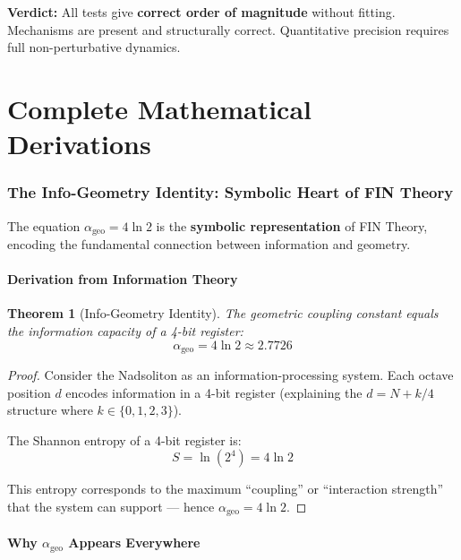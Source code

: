 \documentclass[11pt,a4paper]{book}
\newtheorem{theorem}{Theorem}[section]
\theoremstyle{remark}
\newcommand{\alphageo}{\alpha_{\text{geo}}}
\begin{document}
\textbf{Verdict:} All tests give \textbf{correct order of magnitude} without fitting. Mechanisms are present and structurally correct. Quantitative precision requires full non-perturbative dynamics.

\part{Complete Mathematical Derivations}

\section{The Info-Geometry Identity: Symbolic Heart of FIN Theory}

The equation $\alphageo = 4\ln 2$ is the \textbf{symbolic representation} of FIN Theory, encoding the fundamental connection between information and geometry.

\subsection{Derivation from Information Theory}

\begin{theorem}[Info-Geometry Identity]
The geometric coupling constant equals the information capacity of a 4-bit register:
\begin{equation}
\boxed{\alphageo = 4 \ln 2 \approx 2.7726}
\end{equation}
\end{theorem}

\begin{proof}
Consider the Nadsoliton as an information-processing system. Each octave position $d$ encodes information in a 4-bit register (explaining the $d = N + k/4$ structure where $k \in \{0,1,2,3\}$).

The Shannon entropy of a 4-bit register is:
\begin{equation}
S = \ln(2^4) = 4 \ln 2
\end{equation}

This entropy corresponds to the maximum ``coupling'' or ``interaction strength'' that the system can support --- hence $\alphageo = 4\ln 2$.
\end{proof}

\subsection{Why $\alphageo$ Appears Everywhere}
\end{document}
